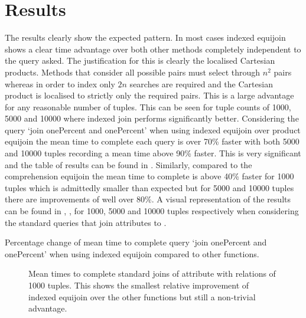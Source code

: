 \section{Results}\label{sec:benchmark:results}
The results clearly show the expected pattern. In most cases indexed equijoin
shows a clear time advantage over both other methods completely independent to
the query asked. The justification for this is clearly the localised Cartesian
products. Methods that consider all possible pairs must select through $n^2$
pairs whereas in order to index only $2n$ searches are required and the
Cartesian product is localised to strictly only the required pairs. This is a
large advantage for any reasonable number of tuples. This can be seen for tuple
counts of 1000, 5000 and 10000 where indexed join performs significantly better.
Considering the query `join onePercent and onePercent' when using indexed
equijoin over product equijoin the mean time to complete each query is over 70\% faster
with both 5000 and 10000 tuples recording a mean time above 90\% faster. This
is very significant and the table of results can be found in
. Similarly, compared to the comprehension
equijoin the mean time to complete is above 40\% faster for 1000 tuples which is
admittedly smaller than expected but for 5000 and 10000 tuples there are
improvements of well over 80\%. A visual representation of the results can be
found in ,
,
 for 1000, 5000 and 10000 tuples
respectively when considering the standard queries that join attributes to
.

\begin{table}[b]
    \centering
    
    \caption{Percentage change of mean time to complete query `join onePercent
        and onePercent' when using indexed equijoin compared to other
    functions.}
    \label{tab:percentage-change-of-means-join-onePercent-and-onePercent}
\end{table}

\begin{figure}[p]
    
    \caption{Mean times to complete standard joins of
     attribute with relations of 1000 tuples. This
shows the smallest relative improvement of indexed equijoin over the other
functions but still a non-trivial advantage.}
    \label{fig:benchmark:onePercent-1000}
\end{figure}

